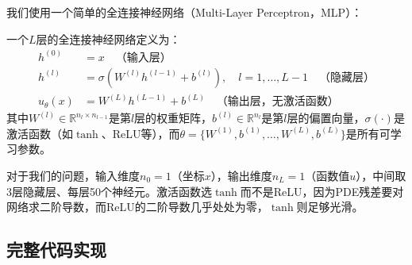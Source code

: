 我们使用一个简单的全连接神经网络（Multi-Layer Perceptron，MLP）：

\begin{definition}[全连接神经网络]
一个$L$层的全连接神经网络定义为：
\begin{align}
    h^{(0)} &= x \quad \text{（输入层）} \\
    h^{(l)} &= \sigma(W^{(l)} h^{(l-1)} + b^{(l)}), \quad l = 1, \ldots, L-1 \quad \text{（隐藏层）} \\
    u_\theta(x) &= W^{(L)} h^{(L-1)} + b^{(L)} \quad \text{（输出层，无激活函数）}
\end{align}
其中$W^{(l)} \in \mathbb{R}^{n_l \times n_{l-1}}$是第$l$层的权重矩阵，$b^{(l)} \in \mathbb{R}^{n_l}$是第$l$层的偏置向量，$\sigma(\cdot)$是激活函数（如$\tanh$、ReLU等），而$\theta = \{W^{(1)}, b^{(1)}, \ldots, W^{(L)}, b^{(L)}\}$是所有可学习参数。
\end{definition}

对于我们的问题，输入维度$n_0 = 1$（坐标$x$），输出维度$n_L = 1$（函数值$u$），中间取3层隐藏层、每层50个神经元。激活函数选$\tanh$而不是ReLU，因为PDE残差要对网络求二阶导数，而ReLU的二阶导数几乎处处为零，$\tanh$则足够光滑。

\subsection{完整代码实现}

